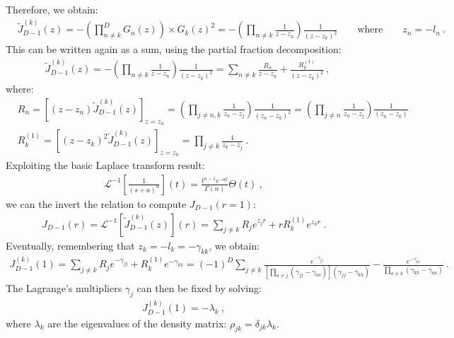 \documentclass[draft,nofootinbib,pre,twocolumn,showpacs,showkeys,groupaddress,preprintnumbers,floatfix]{revtex4-1}
\newcommand{\1}{\mathbbm{1}}
\begin{document}
Therefore, we obtain:
\begin{align*}
& \tilde{J}_{D-1}^{(k)}(z) = -\left(\prod_{n\neq k}^{D}G_n(z)\right) \times G_k(z)^2 = - \left(\prod_{n \neq k} \frac{1}{z-z_n}\right) \frac{1}{(z-z_k)^2} \qquad \mathrm{where} \qquad z_n = -l_n
  ~.
\end{align*}
This can be written again as a sum, using the partial fraction decomposition:
\begin{align*}
& \tilde{J}_{D-1}^{(k)}(z) = - \left(\prod_{n \neq k} \frac{1}{z-z_n}\right) \frac{1}{(z-z_k)^2} = \sum_{n\neq k}\frac{R_n}{z-z_n} + \frac{R_k^{(1)}}{(z-z_k)^2}~,
\end{align*}
where:
\begin{align*}
&R_n = \left[ (z-z_n)\tilde{J}_{D-1}^{(k)}(z)\right]_{z=z_n} = \left(\prod_{j\neq n,k} \frac{1}{z_n - z_j}\right)\frac{1}{(z_n-z_k)^2} = \left(\prod_{j\neq n} \frac{1}{z_n - z_j}\right)\frac{1}{(z_n-z_k)}\\
&R_k^{(1)} = \left[ (z-z_k)^2\tilde{J}_{D-1}^{(k)}(z)\right]_{z=z_k} = \prod_{j\neq k} \frac{1}{z_k-z_j}
  ~.
\end{align*}
Exploiting the basic Laplace transform result:
\begin{align*}
\mathcal{L}^{-1}\left[\frac{1}{\left(s+a\right)^n}\right](t) = \frac{t^{n-1}e^{-at}}{\Gamma(n)}\Theta(t)
  ~,
\end{align*}
we can the invert the relation to compute $J_{D-1}(r=1)$:
\begin{align*}
J_{D-1}(r) = \mathcal{L}^{-1}\left[ \tilde{J}_{D-1}^{(k)}(z)\right](r) = \sum_{j\neq k} R_j e^{z_jr} + rR_k^{(1)}e^{z_kr}
  ~.
\end{align*}
Eventually, remembering that $z_k = - l_{k} = - \gamma_{kk}$, we obtain:
\begin{align*}
J_{D-1}^{(k)}(1) = \sum_{j\neq k} R_j e^{-\gamma_{jj}} + R_k^{(1)}e^{-\gamma_{kk}} = (-1)^{D}\sum_{j \neq k} \frac{e^{-\gamma_{jj}}}{\left[\prod_{a \neq j}(\gamma_{jj}-\gamma_{aa})\right] (\gamma_{jj}-\gamma_{kk})} - \frac{e^{-\gamma_{kk}}}{\prod_{a\neq k}(\gamma_{kk}-\gamma_{aa})}
  ~.
\end{align*}
The Lagrange's multipliers $\gamma_j$ can then be fixed by solving:
\begin{align*}
J_{D-1}^{(k)}(1) = - \lambda_k
  ~,
\end{align*}
where $\lambda_k$ are the eigenvalues of the density matrix: $\rho_{jk} = \delta_{jk} \lambda_k$.
\end{document}
